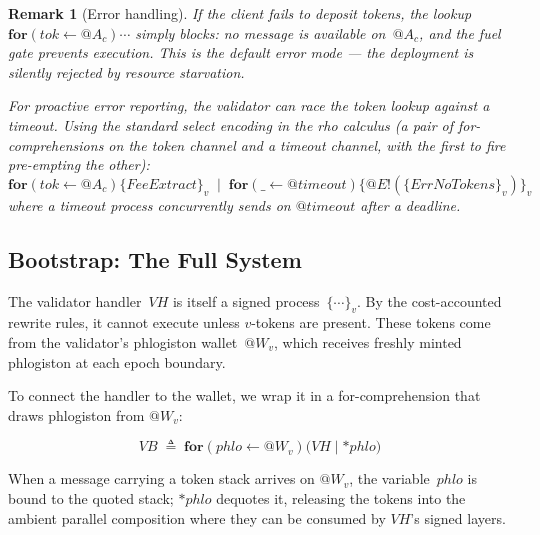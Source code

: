 \documentclass[11pt,a4paper]{article}
\makeatletter
\newtheorem{remark}[theorem]{Remark}
\newcommand{\Par}{\mathbin{|}}
\newcommand{\forc}{\mathbf{for}}
\newcommand{\send}[2]{#1 !\!\left( #2 \right)}
\newcommand{\recv}[3]{\forc\!\left( #1 \leftarrow #2 \right) #3}
\newcommand{\drop}[1]{{\ast} #1}
\newcommand{\quot}[1]{@#1}
\newcommand{\signed}[2]{\{#1\}_{#2}}
\makeatother
\begin{document}
\begin{remark}[Error handling]
  \label{rem:error}
  If the client fails to deposit tokens, the lookup
  $\recv{\mathit{tok}}{\quot{A_c}}{\cdots}$ simply
  \emph{blocks}: no message is available on~$\quot{A_c}$,
  and the fuel gate prevents execution.  This is the
  \emph{default} error mode --- the deployment is silently
  rejected by resource starvation.

  For proactive error reporting, the validator can race the
  token lookup against a timeout.  Using the standard
  select encoding in the rho calculus (a pair of
  for-comprehensions on the token channel and a timeout
  channel, with the first to fire pre-empting the other):
  \[
    \recv{\mathit{tok}}{\quot{A_c}}{
      \signed{\mathit{FeeExtract}}{v}
    }
    \;\Par\;
    \recv{\mathit{\_}}{\quot{\mathit{timeout}}}{
      \signed{
        \send{\quot{E}}{
          \signed{\mathit{ErrNoTokens}}{v}
        }
      }{v}
    }
  \]
  where a timeout process concurrently sends on
  $\quot{\mathit{timeout}}$ after a deadline.
\end{remark}

\subsection{Bootstrap: The Full System}
\label{app:ex-bootstrap}

The validator handler~$\mathit{VH}$ is itself a signed
process~$\signed{\cdots}{v}$.  By the cost-accounted rewrite
rules, it cannot execute unless $v$-tokens are present.
These tokens come from the validator's phlogiston
wallet~$\quot{W_v}$, which receives freshly minted
phlogiston at each epoch boundary.

To connect the handler to the wallet, we wrap it in a
for-comprehension that draws phlogiston from
$\quot{W_v}$:

\begin{equation}
  \boxed{
    \mathit{VB}
    \;\triangleq\;
    \recv{\mathit{phlo}}{\quot{W_v}}{
      \bigl(
        \mathit{VH} \Par \drop{\mathit{phlo}}
      \bigr)
    }
  }
  \label{eq:validator-boot}
\end{equation}

\noindent
When a message carrying a token stack arrives on
$\quot{W_v}$, the variable~$\mathit{phlo}$ is bound to
the quoted stack; $\drop{\mathit{phlo}}$ dequotes it,
releasing the tokens into the ambient parallel composition
where they can be consumed by $\mathit{VH}$'s signed layers.
\end{document}
